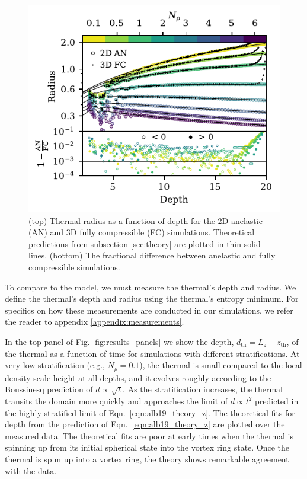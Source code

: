 \begin{figure}[p!]
    \includegraphics[width=\columnwidth]{./figs/diff_AN_FC.pdf}
    \caption[Comparison of low Mach number Fully Compressible and Anelastic thermal results.]
	{
	(top) Thermal radius as a function of depth for the 2D anelastic (AN) and 3D fully compressible (FC) simulations.
	Theoretical predictions from subsection \ref{sec:theory} are plotted in thin solid lines.
	(bottom) The fractional difference between anelastic and fully compressible simulations.
    \label{fig:diff} }
\end{figure}

To compare to the model, we must measure the thermal's depth and radius.
We define the thermal's depth and radius using the thermal's entropy minimum.
For specifics on how these measurements are conducted in our simulations, we refer the reader to appendix \ref{appendix:measurements}.

In the top panel of Fig. \ref{fig:results_panels} we show the depth, $d_{\text{th}} = L_z - z_{\text{th}}$, of the thermal as a function of time for simulations with different stratifications. 
At very low stratification (e.g., $N_\rho = 0.1$), the thermal is small compared to the local density scale height at all depths, and it evolves roughly according to the Boussinesq prediction of $d \propto \sqrt{t}$. 
As the stratification increases, the thermal transits the domain more quickly and approaches the limit of $d \propto t^2$ predicted in the highly stratified limit of Eqn.~\ref{eqn:alb19_theory_z}. 
The theoretical fits for depth from the prediction of Eqn.~\ref{eqn:alb19_theory_z} are plotted over the measured data.
The theoretical fits are poor at early times when the thermal is spinning up from its initial spherical state into the vortex ring state.
Once the thermal is spun up into a vortex ring, the theory shows remarkable agreement with the data.

